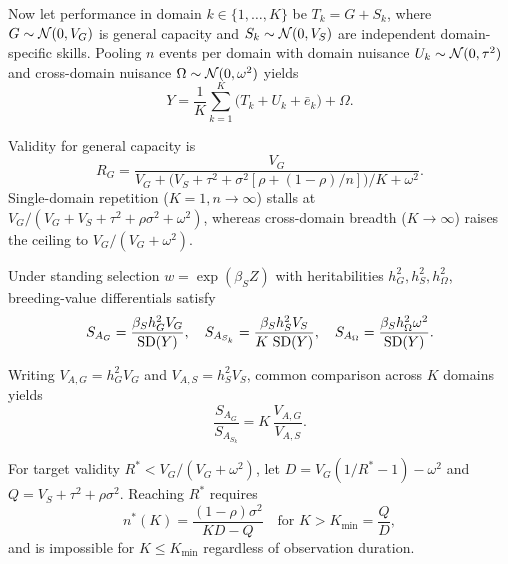 Now let performance in domain $k\in\{1,\dots,K\}$ be $T_k=G+S_k$, where $G\sim\mathcal{N}(0,V_G)$ is general capacity and $S_k\sim\mathcal{N}(0,V_S)$ are independent domain-specific skills. Pooling $n$ events per domain with domain nuisance $U_k\sim\mathcal{N}(0,\tau^2)$ and cross-domain nuisance $\Omega\sim\mathcal{N}(0,\omega^2)$ yields
\begin{equation}
Y=\frac1K\sum_{k=1}^K\big(T_k+U_k+\bar e_k\big)+\Omega.\label{eq:portfolio}
\end{equation}

\begin{proposition}\label{prop:portfolio}
Validity for general capacity is
\begin{equation}
R_G=\frac{V_G}{V_G+\big(V_S+\tau^2+\sigma^2[\rho+(1-\rho)/n]\big)/K+\omega^2}.\label{eq:RG}
\end{equation}
Single-domain repetition ($K=1,n\to\infty$) stalls at $V_G/(V_G+V_S+\tau^2+\rho\sigma^2+\omega^2)$, whereas cross-domain breadth ($K\to\infty$) raises the ceiling to $V_G/(V_G+\omega^2)$.
\end{proposition}

\begin{proposition}\label{prop:diversity}
Under standing selection $w=\exp(\beta_SZ)$ with heritabilities $h_G^2,h_S^2,h_\Omega^2$, breeding-value differentials satisfy
\begin{equation}
S_{A_G}=\frac{\beta_Sh_G^2V_G}{\operatorname{SD}(Y)},\quad S_{A_{S_k}}=\frac{\beta_Sh_S^2V_S}{K\,\operatorname{SD}(Y)},\quad S_{A_\Omega}=\frac{\beta_Sh_\Omega^2\omega^2}{\operatorname{SD}(Y)}.\label{eq:diversity}
\end{equation}
\end{proposition}

\begin{corollary}\label{cor:generalist}
Writing $V_{A,G}=h_G^2V_G$ and $V_{A,S}=h_S^2V_S$, common comparison across $K$ domains yields
\begin{equation}
\frac{S_{A_G}}{S_{A_{S_k}}}=K\,\frac{V_{A,G}}{V_{A,S}}.\label{eq:aimK}
\end{equation}
\end{corollary}

\begin{proposition}\label{prop:time}
For target validity $R^*<V_G/(V_G+\omega^2)$, let $D=V_G(1/R^*-1)-\omega^2$ and $Q=V_S+\tau^2+\rho\sigma^2$. Reaching $R^*$ requires
\begin{equation}
n^*(K)=\frac{(1-\rho)\sigma^2}{KD-Q}\quad\text{for }K>K_{\min}=\frac{Q}{D},\label{eq:nstarK}
\end{equation}
and is impossible for $K\le K_{\min}$ regardless of observation duration.
\end{proposition}

